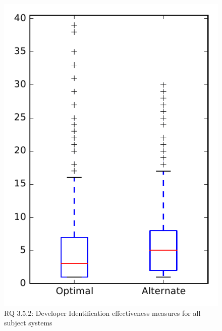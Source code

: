 
\begin{figure}
\centering
\includegraphics[height=0.4\textheight]{figures/combo/dit_rq2_overview}
\caption{RQ 3.5.2: Developer Identification effectiveness measures for all subject systems}
\label{fig:dit:rq2:overview}
\end{figure}
